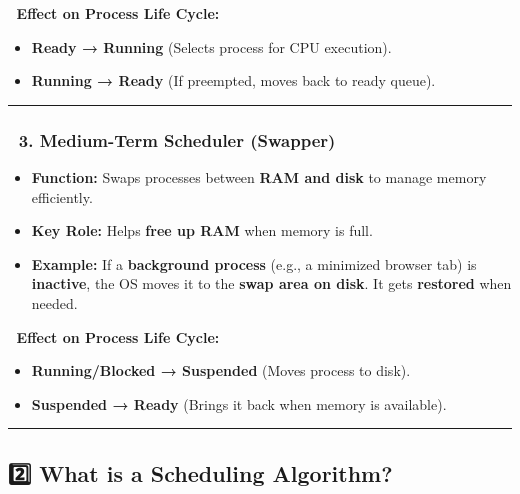 \documentclass[
]{article}
\providecommand{\tightlist}{%
  \setlength{\itemsep}{0pt}\setlength{\parskip}{0pt}}
\begin{document}
📌 \textbf{Effect on Process Life Cycle:}

\begin{itemize}
\tightlist
\item
  \textbf{Ready → Running} (Selects process for CPU execution).
\item
  \textbf{Running → Ready} (If preempted, moves back to ready queue).
\end{itemize}

\begin{center}\rule{0.5\linewidth}{0.5pt}\end{center}

\subsubsection{\texorpdfstring{\textbf{📍 3. Medium-Term Scheduler
(Swapper)}}{📍 3. Medium-Term Scheduler (Swapper)}}\label{medium-term-scheduler-swapper}

\begin{itemize}
\tightlist
\item
  \textbf{Function:} Swaps processes between \textbf{RAM and disk} to
  manage memory efficiently.
\item
  \textbf{Key Role:} Helps \textbf{free up RAM} when memory is full.
\item
  \textbf{Example:} If a \textbf{background process} (e.g., a minimized
  browser tab) is \textbf{inactive}, the OS moves it to the \textbf{swap
  area on disk}. It gets \textbf{restored} when needed.
\end{itemize}

📌 \textbf{Effect on Process Life Cycle:}

\begin{itemize}
\tightlist
\item
  \textbf{Running/Blocked → Suspended} (Moves process to disk).
\item
  \textbf{Suspended → Ready} (Brings it back when memory is available).
\end{itemize}

\begin{center}\rule{0.5\linewidth}{0.5pt}\end{center}

\subsection{\texorpdfstring{\textbf{2️⃣ What is a Scheduling
Algorithm?}}{2️⃣ What is a Scheduling Algorithm?}}\label{what-is-a-scheduling-algorithm}
\end{document}

